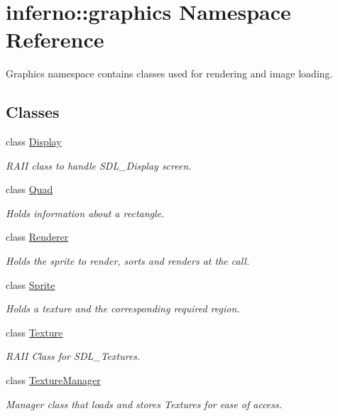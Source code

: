 \hypertarget{namespaceinferno_1_1graphics}{}\section{inferno\+:\+:graphics Namespace Reference}
\label{namespaceinferno_1_1graphics}


Graphics namespace contains classes used for rendering and image loading.  


\subsection*{Classes}
\begin{DoxyCompactItemize}
\item 
class \mbox{\hyperlink{classinferno_1_1graphics_1_1_display}{Display}}
\begin{DoxyCompactList}\small\item\em R\+A\+II class to handle S\+D\+L\+\_\+\+Display screen. \end{DoxyCompactList}\item 
class \mbox{\hyperlink{classinferno_1_1graphics_1_1_quad}{Quad}}
\begin{DoxyCompactList}\small\item\em Holds information about a rectangle. \end{DoxyCompactList}\item 
class \mbox{\hyperlink{classinferno_1_1graphics_1_1_renderer}{Renderer}}
\begin{DoxyCompactList}\small\item\em Holds the sprite to render, sorts and renders at the call. \end{DoxyCompactList}\item 
class \mbox{\hyperlink{classinferno_1_1graphics_1_1_sprite}{Sprite}}
\begin{DoxyCompactList}\small\item\em Holds a texture and the corresponding required region. \end{DoxyCompactList}\item 
class \mbox{\hyperlink{classinferno_1_1graphics_1_1_texture}{Texture}}
\begin{DoxyCompactList}\small\item\em R\+A\+II Class for S\+D\+L\+\_\+\+Textures. \end{DoxyCompactList}\item 
class \mbox{\hyperlink{classinferno_1_1graphics_1_1_texture_manager}{Texture\+Manager}}
\begin{DoxyCompactList}\small\item\em Manager class that loads and stores Textures for ease of access. \end{DoxyCompactList}\end{DoxyCompactItemize}
